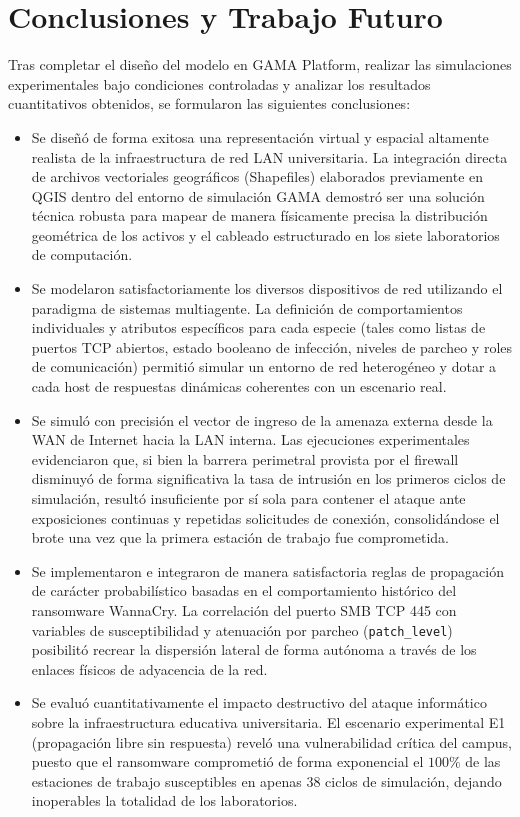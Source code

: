 \section{Conclusiones y Trabajo Futuro}
\label{sec:conclusiones}
Tras completar el diseño del modelo en GAMA Platform, realizar las simulaciones experimentales bajo condiciones controladas y analizar los resultados cuantitativos obtenidos, se formularon las siguientes conclusiones:

\begin{itemize}
    \item Se diseñó de forma exitosa una representación virtual y espacial altamente realista de la infraestructura de red LAN universitaria. La integración directa de archivos vectoriales geográficos (Shapefiles) elaborados previamente en QGIS dentro del entorno de simulación GAMA demostró ser una solución técnica robusta para mapear de manera físicamente precisa la distribución geométrica de los activos y el cableado estructurado en los siete laboratorios de computación.
    \item Se modelaron satisfactoriamente los diversos dispositivos de red utilizando el paradigma de sistemas multiagente. La definición de comportamientos individuales y atributos específicos para cada especie (tales como listas de puertos TCP abiertos, estado booleano de infección, niveles de parcheo y roles de comunicación) permitió simular un entorno de red heterogéneo y dotar a cada host de respuestas dinámicas coherentes con un escenario real.
    \item Se simuló con precisión el vector de ingreso de la amenaza externa desde la WAN de Internet hacia la LAN interna. Las ejecuciones experimentales evidenciaron que, si bien la barrera perimetral provista por el firewall disminuyó de forma significativa la tasa de intrusión en los primeros ciclos de simulación, resultó insuficiente por sí sola para contener el ataque ante exposiciones continuas y repetidas solicitudes de conexión, consolidándose el brote una vez que la primera estación de trabajo fue comprometida.
    \item Se implementaron e integraron de manera satisfactoria reglas de propagación de carácter probabilístico basadas en el comportamiento histórico del ransomware WannaCry. La correlación del puerto SMB TCP 445 con variables de susceptibilidad y atenuación por parcheo (\texttt{patch\_}\allowbreak\texttt{level}) posibilitó recrear la dispersión lateral de forma autónoma a través de los enlaces físicos de adyacencia de la red.
    \item Se evaluó cuantitativamente el impacto destructivo del ataque informático sobre la infraestructura educativa universitaria. El escenario experimental E1 (propagación libre sin respuesta) reveló una vulnerabilidad crítica del campus, puesto que el ransomware comprometió de forma exponencial el $100\%$ de las estaciones de trabajo susceptibles en apenas 38 ciclos de simulación, dejando inoperables la totalidad de los laboratorios.

\end{itemize}
